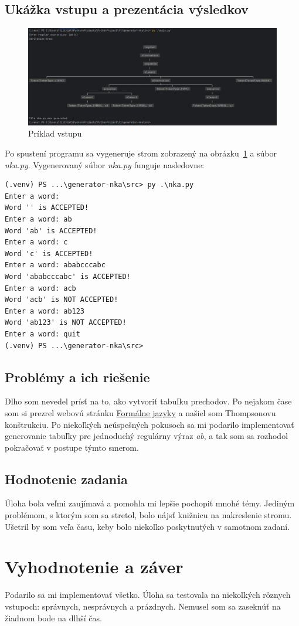 \documentclass[a4paper,12pt]{article}
\begin{document}

\subsection{Ukážka vstupu a prezentácia výsledkov}

\begin{figure}
    \centering
    \includegraphics[width=1\textwidth]{figs/tree-example}
    \caption{Príklad vstupu}
    \label{fig:tree-example}
\end{figure}
Po spustení programu sa vygeneruje strom zobrazený na obrázku~\ref{fig:tree-example} a súbor \textit{nka.py}.
Vygenerovaný súbor \textit{nka.py} funguje nasledovne:
\lstset{basicstyle=\ttfamily}
\begin{lstlisting}
(.venv) PS ...\generator-nka\src> py .\nka.py
Enter a word:
Word '' is ACCEPTED!
Enter a word: ab
Word 'ab' is ACCEPTED!
Enter a word: c
Word 'c' is ACCEPTED!
Enter a word: ababcccabc
Word 'ababcccabc' is ACCEPTED!
Enter a word: acb
Word 'acb' is NOT ACCEPTED!
Enter a word: ab123
Word 'ab123' is NOT ACCEPTED!
Enter a word: quit
(.venv) PS ...\generator-nka\src>
\end{lstlisting}


\subsection{Problémy a ich riešenie}

Dlho som nevedel prísť na to, ako vytvoriť tabuľku prechodov.
Po nejakom čase som si prezrel webovú stránku \href{https://kurzy.kpi.fei.tuke.sk/fj/}{Formálne jazyky} a našiel som Thompsonovu konštrukciu.
Po niekoľkých neúspešných pokusoch sa mi podarilo implementovať generovanie tabuľky pre jednoduchý regulárny výraz \textit{ab}, a tak som sa rozhodol pokračovať v postupe týmto smerom.


\subsection{Hodnotenie zadania}

Úloha bola veľmi zaujímavá a pomohla mi lepšie pochopiť mnohé témy. Jediným problémom, s ktorým som sa stretol, bolo nájsť knižnicu na nakreslenie stromu. Ušetril by som veľa času, keby bolo niekoľko poskytnutých v samotnom zadaní.

\section{Vyhodnotenie a záver}

Podarilo sa mi implementovať všetko. Úloha sa testovala na niekoľkých rôznych vstupoch: správnych, nesprávnych a prázdnych. Nemusel som sa zaseknúť na žiadnom bode na dlhší čas.
\end{document}
